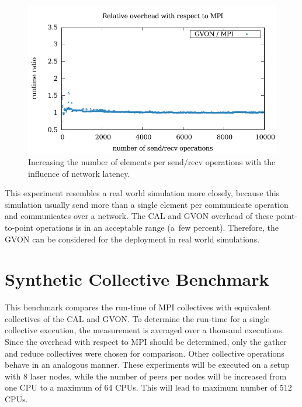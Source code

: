 \begin{figure}[H]
\begin{minipage}[t]{0.5\textwidth}
    \includegraphics[width=\textwidth]{plots/50_nsize_network_overhead_gvon_laser}
  \end{minipage}%
  \caption{Increasing the number of elements per send/recv operations
    with the influence of network latency.}
  \label{fig:nsend_network}
\end{figure}

\noindent This experiment resembles a real world simulation more closely, because
this simulation usually send more than a single element per communicate
operation and communicates over a network.
The CAL and
GVON overhead of these point-to-point operations is in an acceptable
range (a~few percent).  Therefore, the GVON can be considered for the
deployment in real world simulations.


\section{Synthetic Collective Benchmark}
This benchmark compares the run-time of MPI collectives with
equivalent collectives of the CAL and GVON.  To determine the run-time
for a single collective execution, the measurement is averaged over a
thousand executions.  Since the overhead with respect to MPI should be
determined, only the gather and reduce collectives were chosen for
comparison. Other collective operations behave in an analogous
manner. These experiments will be executed on a setup with 8 laser
nodes, while the number of peers per nodes will be increased from one
CPU to a maximum of 64 CPUs.  This will lead to maximum number of 512
CPUs.

